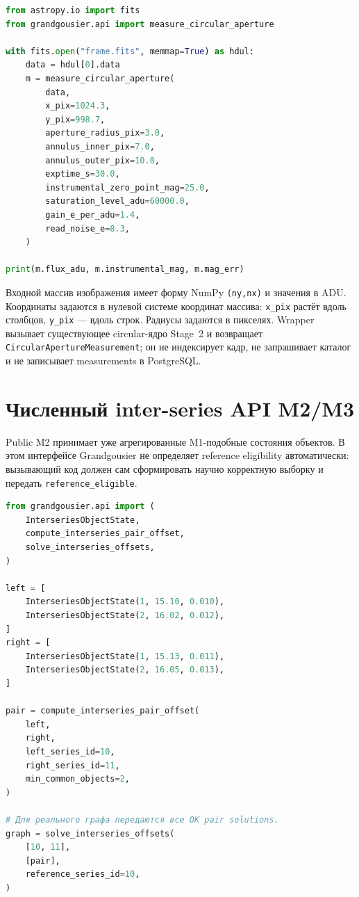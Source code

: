 \begin{lstlisting}[language=Python]
from astropy.io import fits
from grandgousier.api import measure_circular_aperture

with fits.open("frame.fits", memmap=True) as hdul:
    data = hdul[0].data
    m = measure_circular_aperture(
        data,
        x_pix=1024.3,
        y_pix=998.7,
        aperture_radius_pix=3.0,
        annulus_inner_pix=7.0,
        annulus_outer_pix=10.0,
        exptime_s=30.0,
        instrumental_zero_point_mag=25.0,
        saturation_level_adu=60000.0,
        gain_e_per_adu=1.4,
        read_noise_e=8.3,
    )

print(m.flux_adu, m.instrumental_mag, m.mag_err)
\end{lstlisting}

Входной массив изображения имеет форму NumPy \texttt{(ny,nx)} и значения в ADU. Координаты задаются в нулевой системе координат массива: \texttt{x\_pix} растёт вдоль столбцов, \texttt{y\_pix} --- вдоль строк. Радиусы задаются в пикселях. Wrapper вызывает существующее circular-ядро Stage~2 и возвращает \texttt{CircularApertureMeasurement}; он не индексирует кадр, не запрашивает каталог и не записывает measurements в PostgreSQL.

\section{Численный inter-series API M2/M3}

Public M2 принимает уже агрегированные M1-подобные состояния объектов. В этом интерфейсе Grandgousier не определяет reference eligibility автоматически: вызывающий код должен сам сформировать научно корректную выборку и передать \texttt{reference\_eligible}.

\begin{lstlisting}[language=Python]
from grandgousier.api import (
    InterseriesObjectState,
    compute_interseries_pair_offset,
    solve_interseries_offsets,
)

left = [
    InterseriesObjectState(1, 15.10, 0.010),
    InterseriesObjectState(2, 16.02, 0.012),
]
right = [
    InterseriesObjectState(1, 15.13, 0.011),
    InterseriesObjectState(2, 16.05, 0.013),
]

pair = compute_interseries_pair_offset(
    left,
    right,
    left_series_id=10,
    right_series_id=11,
    min_common_objects=2,
)

# Для реального графа передаются все OK pair solutions.
graph = solve_interseries_offsets(
    [10, 11],
    [pair],
    reference_series_id=10,
)
\end{lstlisting}

